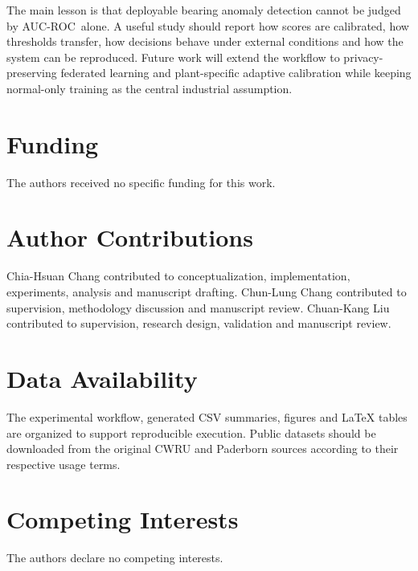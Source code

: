 \documentclass[pdflatex,sn-mathphys-num]{sn-jnl}
\newcommand{\rocauc}{AUC-ROC}
\begin{document}
The main lesson is that deployable bearing anomaly detection cannot be judged by \rocauc\ alone. A useful study should report how scores are calibrated, how thresholds transfer, how decisions behave under external conditions and how the system can be reproduced. Future work will extend the workflow to privacy-preserving federated learning and plant-specific adaptive calibration while keeping normal-only training as the central industrial assumption.

\section*{Funding}

The authors received no specific funding for this work.

\section*{Author Contributions}

Chia-Hsuan Chang contributed to conceptualization, implementation, experiments, analysis and manuscript drafting. Chun-Lung Chang contributed to supervision, methodology discussion and manuscript review. Chuan-Kang Liu contributed to supervision, research design, validation and manuscript review.

\section*{Data Availability}

The experimental workflow, generated CSV summaries, figures and LaTeX tables are organized to support reproducible execution. Public datasets should be downloaded from the original CWRU and Paderborn sources according to their respective usage terms.

\section*{Competing Interests}

The authors declare no competing interests.



\end{document}
